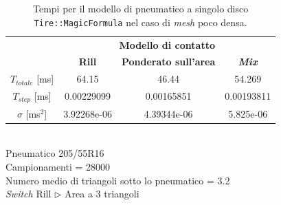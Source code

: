 %
\clearpage
%
\begin{table}
	\centering
	\begin{tabular}{c|c|c|c|}
		\cline{2-4} 
		& \multicolumn{3}{c|}{\textbf{Modello di contatto}} \\
		\cline{2-4} 
		& \textbf{Rill} & \textbf{Ponderato sull'area} & \textbf{\textit{Mix}} \\ 
		\hline 
		\multicolumn{1}{|c|}{$T_{totale}$ [ms]} & 64.15 & 46.44 & 54.269 \\ 
		\hline 
		\multicolumn{1}{|c|}{$T_{step}$ [ms]} & 0.00229099 & 0.00165851 & 0.00193811 \\ 
		\hline 
		\multicolumn{1}{|c|}{$\sigma$ [ms$^2$]} & 3.92268e-06 & 4.39344e-06 & 5.825e-06 \\
		\hline 
	\end{tabular}
	\\[0.5cm]
	Pneumatico 205/55R16\\
	Campionamenti = 28000\\
	Numero medio di triangoli sotto lo pneumatico = 3.2\\
	\textit{Switch} Rill $\triangleright$ Area a 3 triangoli
	\caption{Tempi per il modello di pneumatico a singolo disco \texttt{Tire::MagicFormula} nel caso di \textit{mesh} poco densa.}
	\label{MFpiano}
\end{table}
